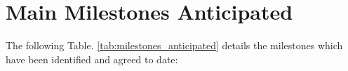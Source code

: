 \documentclass[runningheads,a4paper]{llncs}
\begin{document}
%
%



%
%
\newpage
\section*{Main Milestones Anticipated}

The following Table. \ref{tab:milestones_anticipated} details the milestones which have been identified and agreed to date:
\end{document}
